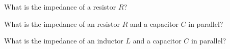 \begin{enumerate}
\ws{\vspace{30px}}



\qitem What is the impedance of a resistor $R$?

\ws{\vspace{30px}}



\qitem What is the impedance of an resistor $R$ and a capacitor $C$ in parallel?

\ws{\vspace{30px}}


\qitem What is the impedance of an inductor $L$ and a capacitor $C$ in parallel?

\ws{\vspace{30px}}





\end{enumerate}

